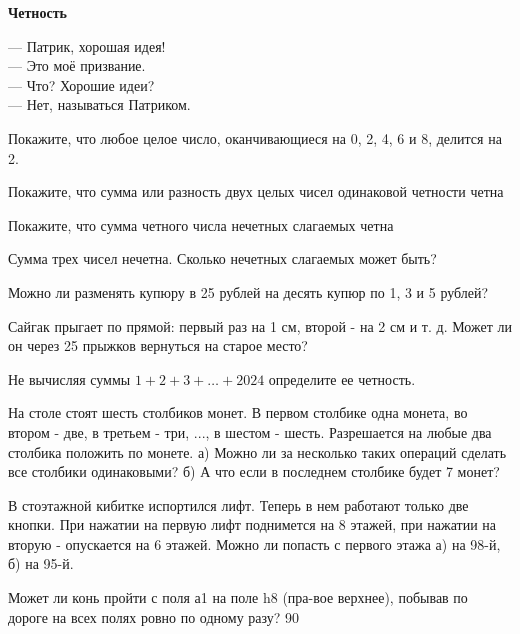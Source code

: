 \centerline{\bf \Huge Четность}


\begin{flushright}
        \scriptsize{— Патрик, хорошая идея!\\
                    — Это моё призвание.\\
                    — Что? Хорошие идеи?\\
                    — Нет, называться Патриком.}
\end{flushright}

 Покажите, что любое целое число, оканчивающиеся на 0, 2, 4, 6 и 8, делится на 2.

Покажите, что сумма или разность двух целых чисел одинаковой четности четна

Покажите, что сумма четного числа нечетных слагаемых четна

 Сумма трех чисел нечетна. Сколько нечетных слагаемых может быть?

 Можно ли разменять купюру в 25 рублей на десять купюр по 1, 3 и 5 рублей?

Сайгак прыгает по прямой: первый раз на 1 см, второй - на 2 см и т. д. Может ли он через 25 прыжков вернуться на старое место?


Не вычисляя суммы $1 + 2 + 3 + \dots + 2024 $ определите ее четность.

 На столе стоят шесть столбиков монет. В первом столбике одна монета, во втором - две, в третьем - три, ..., в шестом - шесть. Разрешается на любые два столбика положить по монете. а) Можно ли за несколько таких операций сделать все столбики одинаковыми? б) А что если в последнем столбике будет 7 монет?

 В стоэтажной кибитке испортился лифт. Теперь в нем работают только две кнопки. При нажатии на первую лифт поднимется на 8 этажей, при нажатии на вторую - опускается на 6 этажей. Можно ли попасть с первого этажа а) на 98-й, б) на 95-й.  

Может ли конь пройти с поля а1 на поле h8 (пра-вое верхнее), побывав по дороге на всех полях ровно по одному разу?
90



